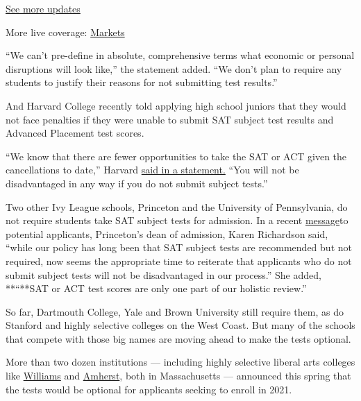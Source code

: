 \href{https://www.nytimes.com/2020/08/01/world/coronavirus-covid-19.html?action=click\&pgtype=Article\&state=default\&region=MAIN_CONTENT_1\&context=storylines_live_updates}{See
more updates}

More live coverage:
\href{https://www.nytimes.com/live/2020/07/31/business/stock-market-today-coronavirus?action=click\&pgtype=Article\&state=default\&region=MAIN_CONTENT_1\&context=storylines_live_updates}{Markets}

``We can't pre-define in absolute, comprehensive terms what economic or
personal disruptions will look like,'' the statement added. ``We don't
plan to require any students to justify their reasons for not submitting
test results.''

And Harvard College recently told applying high school juniors that they
would not face penalties if they were unable to submit SAT subject test
results and Advanced Placement test scores.

``We know that there are fewer opportunities to take the SAT or ACT
given the cancellations to date,'' Harvard
\href{https://college.harvard.edu/about/news-announcements/special-message-high-school-juniors-applying-harvard}{said
in a statement.} ``You will not be disadvantaged in any way if you do
not submit subject tests.''

Two other Ivy League schools, Princeton and the University of
Pennsylvania, do not require students take SAT subject tests for
admission. In a recent
\href{https://admission.princeton.edu/how-apply/standardized-testing/statement-applicants-princetons-class-2025}{message}to
potential applicants, Princeton's dean of admission, Karen Richardson
said, ``while our policy has long been that SAT subject tests are
recommended but not required, now seems the appropriate time to
reiterate that applicants who do not submit subject tests will not be
disadvantaged in our process.'' She added, **``**SAT or ACT test scores
are only one part of our holistic review.''

So far, Dartmouth College, Yale and Brown University still require them,
as do Stanford and highly selective colleges on the West Coast. But many
of the schools that compete with those big names are moving ahead to
make the tests optional.

More than two dozen institutions --- including highly selective liberal
arts colleges like
\href{https://communications.williams.edu/news-releases/4_6_2020_test_optional/}{Williams}
and
\href{https://www.amherst.edu/news/press-releases/node/768482}{Amherst},
both in Massachusetts --- announced this spring that the tests would be
optional for applicants seeking to enroll in 2021.

